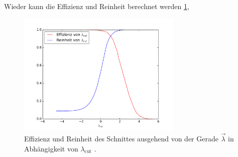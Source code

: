 Wieder kann die Effizienz und Reinheit berechnet werden \ref{fig:effrein},

\begin{figure}
  \centering
  \includegraphics[width=0.7\textwidth]{Eff_Rein_h).pdf}
  \caption{Effizienz und Reinheit des Schnittes ausgehend von der Gerade $\vec \lambda$ in Abhängigkeit von $\lambda_\text{cut}$ .}
  \label{fig:effrein}
\end{figure}


